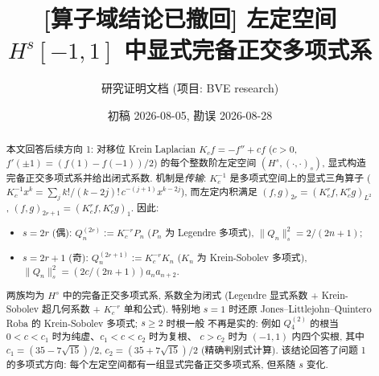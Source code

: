 \documentclass[UTF8]{ctexart}
\title{[算子域结论已撤回] 左定空间 \texorpdfstring{$H^s[-1,1]$}{Hs} 中显式完备正交多项式系}
\author{研究证明文档 (项目: BVE research)}
\date{初稿 2026-08-05, 勘误 2026-08-28}
\begin{document}
\maketitle

\begin{center}
\end{center}

\begin{abstract}
本文回答后续方向 1: 对移位 Krein Laplacian $K_c f = -f'' + c f$ ($c>0$,
$f'(\pm1) = (f(1)-f(-1))/2$) 的每个整数阶左定空间 $(H^s, (\cdot,\cdot)_s)$,
显式构造完备正交多项式系并给出闭式系数. 机制是\emph{传输}:
$K_c^{-1}$ 是多项式空间上的显式三角算子
($K_c^{-1}x^k = \sum_{j} k!/(k-2j)!\, c^{-(j+1)} x^{k-2j}$),
而左定内积满足 $(f,g)_{2r} = (K_c^r f, K_c^r g)_{L^2}$,
$(f,g)_{2r+1} = (K_c^r f, K_c^r g)_1$. 因此:
\begin{itemize}
	\item $s = 2r$ (偶): $Q_n^{(2r)} := K_c^{-r} P_n$ ($P_n$ 为 Legendre 多项式),
		$\|Q_n\|_s^2 = 2/(2n+1)$;
	\item $s = 2r+1$ (奇): $Q_n^{(2r+1)} := K_c^{-r} K_n$ ($K_n$ 为 Krein-Sobolev
		多项式), $\|Q_n\|_s^2 = (2c/(2n+1)) a_n a_{n+2}$.
\end{itemize}
两族均为 $H^s$ 中的完备正交多项式系, 系数全为闭式 (Legendre 显式系数 +
Krein-Sobolev 超几何系数 + $K_c^{-r}$ 单和公式). 特别地 $s=1$ 时还原
Jones--Littlejohn--Quintero Roba 的 Krein-Sobolev 多项式; $s \geq 2$ 时根一般
不再是实的: 例如 $Q_4^{(2)}$ 的根当 $0<c<c_1$ 时为纯虚、$c_1<c<c_2$ 时为复根、
$c>c_2$ 时为 $(-1,1)$ 内四个实根, 其中 $c_1 = (35-7\sqrt{15})/2$,
$c_2 = (35+7\sqrt{15})/2$ (精确判别式计算). 该结论回答了问题 1 的多项式方向:
每个左定空间都有一组显式完备正交多项式系, 但系随 $s$ 变化.
\end{abstract}
\end{document}
